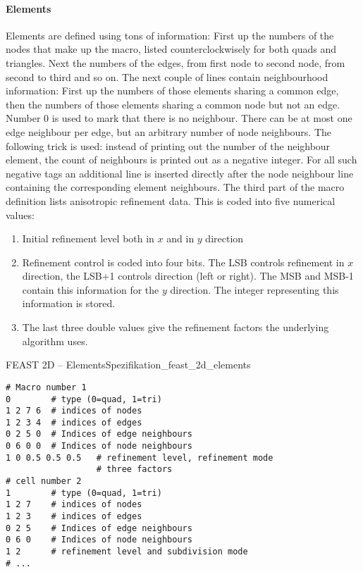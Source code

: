\paragraph{Elements}
Elements are defined using tons of information: First up the numbers of the nodes that make up the macro, 
listed counterclockwisely for both quads and triangles. Next the numbers of the edges, from first node to 
second node, from second to third and so on. The next couple of lines contain neighbourhood information: 
First up the numbers of those elements sharing a common edge, then the numbers of those elements sharing a 
common node but not an edge. Number 0 is used to mark that there is no neighbour. There can be at most one 
edge neighbour per edge, but an arbitrary number of node neighbours. The following trick is used: 
instead of printing out the number of the neighbour element, the count of neighbours is printed out as 
a negative integer. For all such negative tags an additional line is inserted directly after the node 
neighbour line containing the corresponding element neighbours. The third part of the macro definition 
lists anisotropic refinement data. This is coded into five numerical values:
\begin{enumerate}
\item Initial refinement level both in $x$ and in $y$ direction
\item Refinement control is coded into four bits. The LSB controls refinement in $x$ direction, the LSB+1 
controls direction (left or right). The MSB and MSB-1 contain this information for the $y$ direction. 
The integer representing this information is stored.
\item The last three double values give the refinement factors the underlying algorithm uses.
\end{enumerate}
\begin{code}{FEAST 2D -- Elements}{Spezifikation_feast_2d_elements}
\begin{verbatim}
# Macro number 1
0        # type (0=quad, 1=tri)
1 2 7 6  # indices of nodes
1 2 3 4  # indices of edges
0 2 5 0  # Indices of edge neighbours
0 6 0 0  # Indices of node neighbours
1 0 0.5 0.5 0.5   # refinement level, refinement mode
                  # three factors
# cell number 2
1        # type (0=quad, 1=tri)
1 2 7    # indices of nodes
1 2 3    # indices of edges
0 2 5    # Indices of edge neighbours
0 6 0    # Indices of node neighbours
1 2      # refinement level and subdivision mode
# ...
\end{verbatim}
\end{code}


